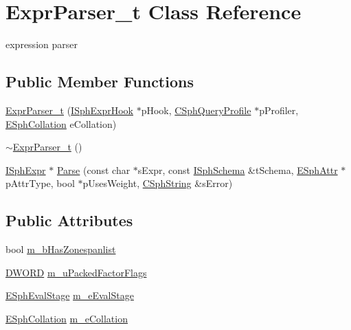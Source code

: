 \hypertarget{classExprParser__t}{\section{Expr\-Parser\-\_\-t Class Reference}
\label{classExprParser__t}
}


expression parser  


\subsection*{Public Member Functions}
\begin{DoxyCompactItemize}
\item 
\hyperlink{classExprParser__t_a39e9a2e70c76cca100b062d4f145c80d}{Expr\-Parser\-\_\-t} (\hyperlink{structISphExprHook}{I\-Sph\-Expr\-Hook} $\ast$p\-Hook, \hyperlink{classCSphQueryProfile}{C\-Sph\-Query\-Profile} $\ast$p\-Profiler, \hyperlink{sphinxexpr_8h_a78197b7b74319074237ecaf5d99cfbe5}{E\-Sph\-Collation} e\-Collation)
\item 
\hyperlink{classExprParser__t_a21678d06ce6db058360311b2f6681925}{$\sim$\-Expr\-Parser\-\_\-t} ()
\item 
\hyperlink{structISphExpr}{I\-Sph\-Expr} $\ast$ \hyperlink{classExprParser__t_aea98905a1ad2ef005f768abfedf90717}{Parse} (const char $\ast$s\-Expr, const \hyperlink{classISphSchema}{I\-Sph\-Schema} \&t\-Schema, \hyperlink{sphinxexpr_8h_aa883df0db2e4468a107fdd2d2ae625a3}{E\-Sph\-Attr} $\ast$p\-Attr\-Type, bool $\ast$p\-Uses\-Weight, \hyperlink{structCSphString}{C\-Sph\-String} \&s\-Error)
\end{DoxyCompactItemize}
\subsection*{Public Attributes}
\begin{DoxyCompactItemize}
\item 
bool \hyperlink{classExprParser__t_a128540ad6f861a13a651a5a605bc51bf}{m\-\_\-b\-Has\-Zonespanlist}
\item 
\hyperlink{sphinxstd_8h_a798af1e30bc65f319c1a246cecf59e39}{D\-W\-O\-R\-D} \hyperlink{classExprParser__t_a98dfb1fb9e4498b7289cb9591e6766a0}{m\-\_\-u\-Packed\-Factor\-Flags}
\item 
\hyperlink{sphinxexpr_8h_ae5eb5e13e926842882703cd0bd53ee46}{E\-Sph\-Eval\-Stage} \hyperlink{classExprParser__t_a3bdf9eb2abc2d2fcbf023a04e962c50a}{m\-\_\-e\-Eval\-Stage}
\item 
\hyperlink{sphinxexpr_8h_a78197b7b74319074237ecaf5d99cfbe5}{E\-Sph\-Collation} \hyperlink{classExprParser__t_ae5a38bee01844d020923825c999968d6}{m\-\_\-e\-Collation}
\end{DoxyCompactItemize}
